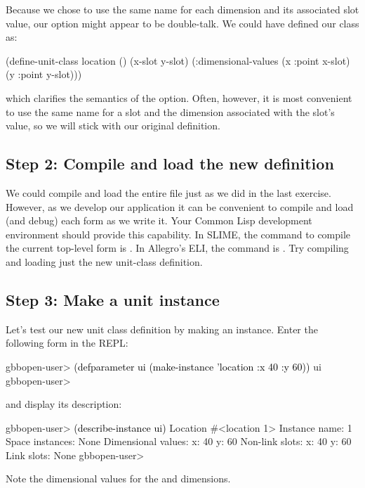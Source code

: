 \documentclass[10pt,twoside,english,pdftex]{article}
\begin{document}
Because we chose to use the same name for each dimension and its
associated slot value, our  option might
appear to be double-talk.  We could have defined our class as:
%
\W\supp
\begin{example}
\textcolor{darkergray}{%
  (define-unit-class location ()
    (x-slot y-slot)
    (:dimensional-values
      (x :point x-slot)
      (y :point y-slot)))}
\end{example}
%
which clarifies the semantics of the 
option.  Often, however, it is most convenient to use the same name
for a slot and the dimension associated with the slot's value, so we
will stick with our original definition.

\subsection*{Step 2: Compile and load the new definition}

We could compile and load the entire  file
just as we did in the last exercise.  However, as we develop our
application it can be convenient to compile and load (and debug) each
form as we write it.  Your Common Lisp development environment should
provide this capability.  In SLIME, the command to compile the current
top-level form is .  In Allegro's ELI, the command is
.  Try compiling and loading just the new
 unit-class definition.

\subsection*{Step 3: Make  a  unit instance}

%
%
Let's test our new  unit class definition by making an
instance.  Enter the following form in the REPL:
%
\W\supp
\begin{example}
\textcolor{darkergray}{%
  gbbopen-user> \textcolor{black}{(defparameter ui (make-instance 'location :x 40 :y 60))}
  ui
  gbbopen-user>}
\end{example}
%
%
and display its description:
%
\W\supp\notpretop
\begin{example}
\textcolor{darkergray}{%
  gbbopen-user> \textcolor{black}{(describe-instance ui)}
  Location #<location 1>
    Instance name: 1
    Space instances: None
    Dimensional values:
      x:  40
      y:  60
    Non-link slots:
      x:  40
      y:  60
    Link slots: None
  gbbopen-user>}
\end{example}
%
Note the dimensional values for the  and  dimensions.
\end{document}
